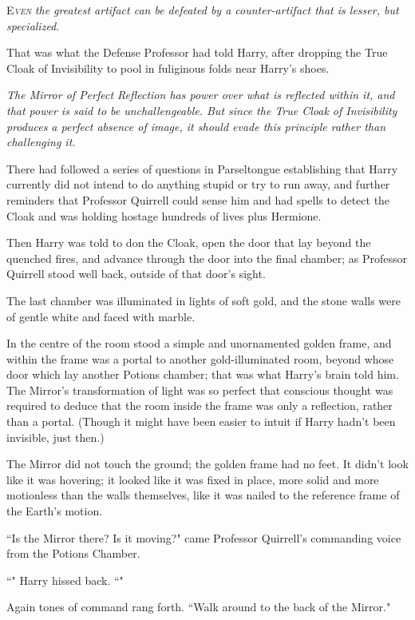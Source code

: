 
\lettrine{E}{\emph{ven}} \emph{the greatest artifact can be defeated by a counter-artifact that is lesser, but specialized}.

That was what the Defense Professor had told Harry, after dropping the True Cloak of Invisibility to pool in fuliginous folds near Harry's shoes.

\emph{The Mirror of Perfect Reflection has power over what is reflected within it, and that power is said to be unchallengeable. But since the True Cloak of Invisibility produces a perfect absence of image, it should evade this principle rather than challenging it.}

There had followed a series of questions in Parseltongue establishing that Harry currently did not intend to do anything stupid or try to run away, and further reminders that Professor Quirrell could sense him and had spells to detect the Cloak and was holding hostage hundreds of lives plus Hermione.

Then Harry was told to don the Cloak, open the door that lay beyond the quenched fires, and advance through the door into the final chamber; as Professor Quirrell stood well back, outside of that door's sight.

The last chamber was illuminated in lights of soft gold, and the stone walls were of gentle white and faced with marble.

In the centre of the room stood a simple and unornamented golden frame, and within the frame was a portal to another gold-illuminated room, beyond whose door which lay another Potions chamber; that was what Harry's brain told him. The Mirror's transformation of light was so perfect that conscious thought was required to deduce that the room inside the frame was only a reflection, rather than a portal. (Though it might have been easier to intuit if Harry hadn't been invisible, just then.)

The Mirror did not touch the ground; the golden frame had no feet. It didn't look like it was hovering; it looked like it was fixed in place, more solid and more motionless than the walls themselves, like it was nailed to the reference frame of the Earth's motion.

``Is the Mirror there? Is it moving?" came Professor Quirrell's commanding voice from the Potions Chamber.

``" Harry hissed back. ``"

Again tones of command rang forth. ``Walk around to the back of the Mirror."

